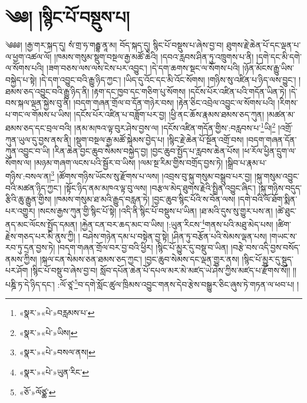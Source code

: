\chapter{༄༅། །སྙིང་པོ་བསྡུས་པ།}༄༅༅། །རྒྱ་གར་སྐད་དུ། སཾ་གྲ་ཧ་གརྦྷ་ནཱ་མ། བོད་སྐད་དུ། སྙིང་པོ་བསྡུས་པ་ཞེས་བྱ་བ། ཐུགས་རྗེ་ཆེན་པོ་དང་ལྡན་པ་ལ་ཕྱག་འཚལ་ལོ། །ཁམས་གསུམ་སྡུག་བསྔལ་རྒྱ་མཚོ་ཆེའི། །དབའ་རླབས་ཤིན་ཏུ་འཁྲུགས་པ་ནི། །དགེ་དང་མི་དགེ་ལ་སོགས་པའི། །ཟག་བཅས་ལས་ལས་ངེས་པར་འབྱུང་། །དེ་དག་ཆགས་སྡང་ལ་སོགས་པའི། །ཉོན་མོངས་རྒྱུ་ཡིས་བསྐྱེད་པ་སྟེ། །དེ་དག་འབྱུང་བའི་རྒྱུ་ཉིད་ཀྱང་། །ཡིད་དུ་འོང་དང་མི་འོང་སོགས། །གཉིས་སུ་འཛིན་པ་ཉིད་ལས་བྱུང་། །ཐམས་ཅད་འབྱུང་བའི་རྒྱུ་ཉིད་ནི། །རྟག་དང་ཁྱབ་དང་གཅིག་པུ་སོགས། །དངོས་པོར་འཛིན་པའི་གདོན་ཡིན་ཏེ། །དེ་བས་སྐལ་ལྡན་སྐྱེས་བུ་ནི། །བདག་གཞན་གྲོལ་བ་དོན་གཉེར་བས། །རྟེན་ཅིང་འབྲེལ་འབྱུང་ལ་སོགས་པའི། །རིགས་པ་གང་ལ་གོམས་པ་ཡིས། །དངོས་པོར་འཛིན་པ་བཟློག་པར་བྱ། །ཕྱི་ནང་ཆོས་རྣམས་ཐམས་ཅད་ཀུན། །མཚན་མ་ཐམས་ཅད་དང་བྲལ་བའི། །ནམ་མཁའ་ལྟ་བུར་ཤེས་བྱས་ལ། །དངོས་འཛིན་གདོན་གྱིས་:བརླབས་པ་\footnote{«སྣར་»«པེ་»བརླམས་པ་}ཡི།\footnote{«སྣར་»«པེ་»ཡིས།} །འགྲོ་ཀུན་ཡུལ་དུ་བྱས་ནས་ནི། །སྡུག་བསྔལ་རྒྱ་མཚོ་སྐེམས་བྱེད་པ། །སྙིང་རྗེ་ཆེན་པོ་སྔོན་འགྲོ་བས། །བདག་གཞན་དོན་ཀུན་འབྱུང་བ་ཡི། །རིན་ཆེན་བྱང་ཆུབ་སེམས་བསྐྱེད་བྱ། །བྱང་ཆུབ་སྤྱོད་པ་རླབས་ཆེན་པོས། །ཕ་རོལ་ཕྱིན་དྲུག་ལ་སོགས་ལ། །མཉམ་གཞག་ལངས་པའི་སྦྱོར་བ་ཡིས། །ལམ་སྔ་རིམ་གྱིས་བགྲོད་བྱས་ཏེ། །སྒྲིབ་པ་རྣམ་པ་གཉིས་:བསལ་ན།\footnote{«སྣར་»«པེ་»བསལ་ནས།} །ཚོགས་གཉིས་ཡོངས་སུ་རྫོགས་པ་ལས། །འབྲས་བུ་སྐུ་གསུམ་བསྒྲུབ་པར་བྱ། །སྐུ་གསུམ་འབྱུང་བའི་མཚན་ཉིད་ཀྱང་། །སྟོང་ཉིད་ནམ་མཁའ་ལྟ་བུ་ལས། །བརྩལ་མེད་ཐུགས་རྗེའི་སྤྲིན་འབྱུང་ཞིང་། །སྐུ་གཉིས་བདུད་རྩིའི་ཆུ་རྒྱུན་གྱིས། །ཁམས་གསུམ་ཐ་མའི་རྒྱུད་བརླན་ཏེ། །བྱང་ཆུབ་སྙིང་པོའི་ས་བོན་ལས། །དགེ་བའི་ལོ་ཐོག་སྨིན་པར་འགྱུར། །སངས་རྒྱས་ཀུན་གྱི་སྙིང་པོ་སྟེ། །འདི་ནི་སྙིང་པོ་བསྡུས་པ་ཡིན། །ཐ་མའི་དུས་སུ་གྱུར་པས་ན། །ཚེ་ཐུང་ནད་མང་ལོངས་སྤྱོད་དམན། །རྐྱེན་ངན་བར་ཆད་མང་བ་ཡིས། །:ཡུན་རིངས་\footnote{«སྣར་»«པེ་»ཡུན་རིང་}གནས་པའི་མཐུ་མེད་པས། །ཚིག་རྗེས་གཅད་པར་མི་ནུས་ཀྱི། །
བཤེས་གཉེན་དམ་པ་བསྟེན་བྱ་སྟེ། །ཤིན་ཏུ་བརྩོན་པའི་སེམས་ལྡན་པས། །གཡང་ས་རབ་ཏུ་དྲན་བྱས་ཏེ། །བདག་གཞན་གྲོལ་བར་བྱ་བའི་ཕྱིར། །སྙིང་པོ་མྱུར་དུ་བསྡུ་བ་ཡིན། །བརྩེ་བས་འདི་བྱས་བསོད་ནམས་ཀྱིས། །སྐལ་ངན་སེམས་ཅན་ཐམས་ཅད་ཀྱང་། །བྱང་ཆུབ་སེམས་དང་ལྡན་གྱུར་ནས། །སྙིང་པོ་མྱུར་དུ་སྡུད་པར་ཤོག །སྙིང་པོ་བསྡུ་བ་ཞེས་བྱ་བ། སློབ་དཔོན་ཆེན་པོ་དཔལ་མར་མེ་མཛད་ཡེ་ཤེས་ཀྱིས་མཛད་པ་རྫོགས་སོ།། །།པཎྜི་ཏ་དེ་ཉིད་དང་། :ལོ་ཙཱ་\footnote{«ཅོ་»ལོཙྪ་}བ་དགེ་སློང་ཚུལ་ཁྲིམས་འབྱུང་གནས་དེབ་རྩེས་བསྒྱུར་ཅིང་ཞུས་ཏེ་གཏན་ལ་ཕབ་པ། ། 